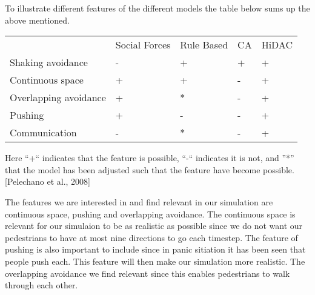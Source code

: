 To illustrate different features of the different models the table below sums up the above mentioned.
\begin{center}
\begin{tabular}{lllll}
 & Social Forces & Rule Based & CA & HiDAC\\
Shaking avoidance     & - & + & + & +\\
Continuous space      & + & + & - & +\\
Overlapping avoidance & + & * & - & +\\
Pushing               & + & - & - & +\\
Communication         & - & * & - & +
\end{tabular}
\end{center}
Here ``+`` indicates that the feature is possible, ``-`` indicates it is not, and ''*'' that the model has been adjusted such that the feature have
become possible. [Pelechano et al., 2008]

The features we are interested in and find relevant in our simulation are continuous space, pushing and overlapping avoidance. The continuous space is
relevant for our simulaion to be as realistic as possible since we do not want our pedestrians to have at most nine directions to go each timestep.
The feature of pushing is also important to include since in panic sitiation it has been seen that people push each. This feature will then make our
simulation more realistic.
The overlapping avoidance we find relevant since this enables pedestrians to walk through each other.
